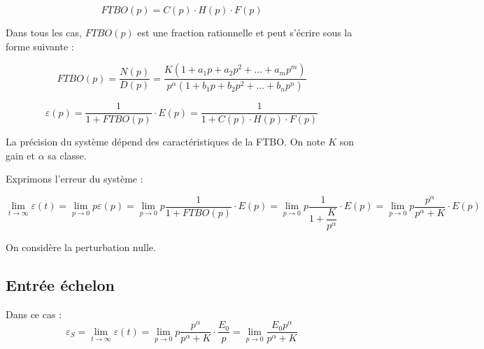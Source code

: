 \documentclass[10pt,fleqn]{article} %
\begin{document}
$$
FTBO(p) = C(p) \cdot H(p) \cdot F(p)
$$


Dans tous les cas, $FTBO(p)$ est une fraction rationnelle et peut s'écrire sous la forme suivante : 

$$
FTBO(p)=\dfrac{N(p)}{D(p)}=\dfrac{K\left(1+a_1p +a_2p^2 + ... + a_m p^m \right)}{p^\alpha \left(1+b_1p +b_2p^2 + ... + b_n p^n \right)}
$$


$$
\varepsilon(p)
=\dfrac{1}{1+FTBO(p)} \cdot E(p)
=\dfrac{1}{1+C(p) \cdot H(p) \cdot F(p)} 
$$

\begin{rem}
La précision du système dépend des caractéristiques de la FTBO. On note $K$ son gain et $\alpha$ sa classe.
\end{rem}


Exprimons l'erreur du système :

$$
\lim\limits_{t\to \infty} \varepsilon(t) = \lim\limits_{p\to 0} p \varepsilon(p)
= \lim\limits_{p\to 0} p \dfrac{1}{1+FTBO(p)} \cdot E(p)
= \lim\limits_{p\to 0} p \dfrac{1}{1+\dfrac{K}{p^\alpha}} \cdot E(p)
= \lim\limits_{p\to 0} p \dfrac{p^\alpha}{p^\alpha+K} \cdot E(p)
$$


\begin{exemple}
On considère la perturbation nulle.
\end{exemple}

\subsection{Entrée échelon}
Dans ce cas : 
$$
\varepsilon_S =
\lim\limits_{t\to \infty} \varepsilon(t) 
= \lim\limits_{p\to 0} p \dfrac{p^\alpha}{p^\alpha+K} \cdot \dfrac{E_0}{p}
= \lim\limits_{p\to 0}  \dfrac{E_0 p^\alpha}{p^\alpha+K} 
$$
\end{document}
